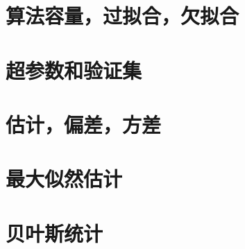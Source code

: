 

\section{算法容量，过拟合，欠拟合}
\label{sec:5.2}

\section{超参数和验证集}
\label{sec:5.3}

\section{估计，偏差，方差}
\label{sec:5.4}

\section{最大似然估计}
\label{sec:5.5}

\section{贝叶斯统计}
\label{sec:5.6}